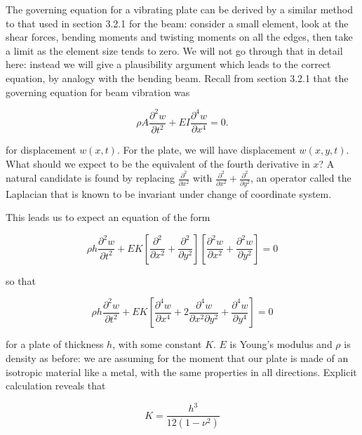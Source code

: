   The governing equation for a vibrating plate can be derived by a similar 
  method to that used in section 3.2.1 for the beam: consider a small element, 
  look at the shear forces, bending moments and twisting moments on all the 
  edges, then take a limit as the element size tends to zero. We will not go 
  through that in detail here: instead we will give a plausibility argument 
  which leads to the correct equation, by analogy with the bending beam. Recall 
  from section 3.2.1 that the governing equation for beam vibration was 

  \begin{equation*}\rho A \dfrac{\partial^2 w}{\partial t^2}+EI 
  \dfrac{\partial^4 w}{\partial x^4}=0. \tag{1}\end{equation*} 

  \noindent{}for displacement $w(x,t)$. For the plate, we will have 
  displacement $w(x,y,t)$. What should we expect to be the equivalent of the 
  fourth derivative in $x$? A natural candidate is found by replacing 
  $\frac{\partial^2}{\partial x^2}$ with $\frac{\partial^2}{\partial 
  x^2}+\frac{\partial^2}{\partial y^2}$, an operator called the Laplacian that 
  is known to be invariant under change of coordinate system. 

  This leads us to expect an equation of the form 

  \begin{equation*}\rho h \dfrac{\partial^2 w}{\partial t^2}+EK 
  \left[\frac{\partial^2}{\partial x^2}+\frac{\partial^2}{\partial y^2} \right] 
  \left[\dfrac{\partial^2 w}{\partial x^2}+\dfrac{\partial^2 w}{\partial 
  y^2}\right]=0\tag{2}\end{equation*} 

  \noindent{}so that 

  \begin{equation*}\rho h \dfrac{\partial^2 w}{\partial t^2}+EK 
  \left[\frac{\partial^4 w}{\partial x^4}+2\frac{\partial^4 w}{\partial x^2 
  \partial y^2} +\frac{\partial^4 w}{\partial y^4} 
  \right]=0\tag{3}\end{equation*} 

  \noindent{}for a plate of thickness $h$, with some constant $K$. $E$ is 
  Young's modulus and $\rho$ is density as before: we are assuming for the 
  moment that our plate is made of an isotropic material like a metal, with the 
  same properties in all directions. Explicit calculation reveals that 

  \begin{equation*}K=\frac{h^3}{12(1-\nu^2)} \tag{4}\end{equation*} 


